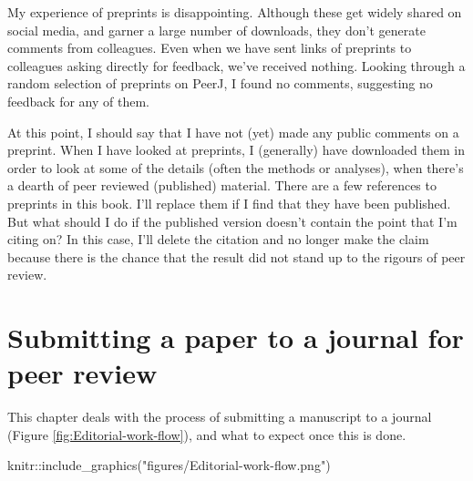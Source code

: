 \documentclass[
]{krantz}
\makeatletter
\newenvironment{Shaded}{\begin{snugshade}}{\end{snugshade}}
\newcommand{\FunctionTok}[1]{\textcolor[rgb]{0,0,0}{#1}}
\newcommand{\NormalTok}[1]{#1}
\newcommand{\SpecialCharTok}[1]{\textcolor[rgb]{0,0,0}{#1}}
\newcommand{\StringTok}[1]{\textcolor[rgb]{0.5,0.5,0.5}{#1}}
\newenvironment{kframe}{%
\medskip{}
\setlength{\fboxsep}{.8em}
 \def\at@end@of@kframe{}%
 \ifinner\ifhmode%
  \def\at@end@of@kframe{\end{minipage}}%
  \begin{minipage}{\columnwidth}%
 \fi\fi%
 \def\FrameCommand##1{\hskip\@totalleftmargin \hskip-\fboxsep
 \colorbox{shadecolor}{##1}\hskip-\fboxsep
     \hskip-\linewidth \hskip-\@totalleftmargin \hskip\columnwidth}%
 \MakeFramed {\advance\hsize-\width
   \@totalleftmargin\z@ \linewidth\hsize
   \@setminipage}}%
 {\par\unskip\endMakeFramed%
 \at@end@of@kframe}
\renewenvironment{Shaded}{\begin{kframe}}{\end{kframe}}
\makeatother
\begin{document}
My experience of preprints is disappointing. Although these get widely shared on social media, and garner a large number of downloads, they don't generate comments from colleagues. Even when we have sent links of preprints to colleagues asking directly for feedback, we've received nothing. Looking through a random selection of preprints on PeerJ, I found no comments, suggesting no feedback for any of them.

At this point, I should say that I have not (yet) made any public comments on a preprint. When I have looked at preprints, I (generally) have downloaded them in order to look at some of the details (often the methods or analyses), when there's a dearth of peer reviewed (published) material. There are a few references to preprints in this book. I'll replace them if I find that they have been published. But what should I do if the published version doesn't contain the point that I'm citing on? In this case, I'll delete the citation and no longer make the claim because there is the chance that the result did not stand up to the rigours of peer review.

\hypertarget{submit}{%
\chapter{Submitting a paper to a journal for peer review}\label{submit}}

This chapter deals with the process of submitting a manuscript to a journal (Figure \ref{fig:Editorial-work-flow}), and what to expect once this is done.



\begin{Shaded}
\begin{Highlighting}[]
\NormalTok{ knitr}\SpecialCharTok{::}\FunctionTok{include\_graphics}\NormalTok{(}\StringTok{"figures/Editorial{-}work{-}flow.png"}\NormalTok{)}
\end{Highlighting}
\end{Shaded}
\end{document}

